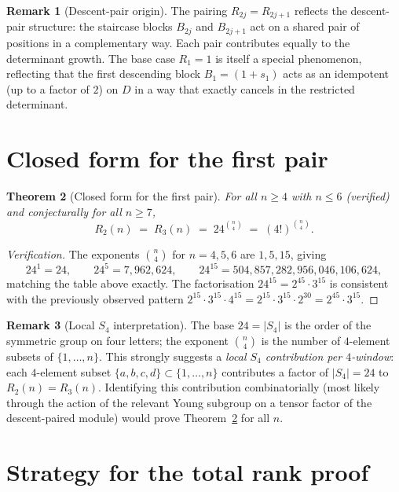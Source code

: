 \documentclass[11pt]{article}
\newtheorem{theorem}{Theorem}
\theoremstyle{definition}
\newtheorem{remark}[theorem]{Remark}
\begin{document}
\begin{remark}[Descent-pair origin]
The pairing $R_{2j} = R_{2j+1}$ reflects the descent-pair structure: the staircase blocks $B_{2j}$ and $B_{2j+1}$ act on a shared pair of positions in a complementary way. Each pair contributes equally to the determinant growth. The base case $R_1 = 1$ is itself a special phenomenon, reflecting that the first descending block $B_1 = (1+s_1)$ acts as an idempotent (up to a factor of $2$) on $D$ in a way that exactly cancels in the restricted determinant.
\end{remark}

\section{Closed form for the first pair}

\begin{theorem}[Closed form for the first pair]
\label{thm:firstpair}
For all $n \ge 4$ with $n \le 6$ (verified) and conjecturally for all $n \ge 7$,
\[
R_2(n) \;=\; R_3(n) \;=\; 24^{\binom{n}{4}} \;=\; (4!)^{\binom{n}{4}}.
\]
\end{theorem}

\begin{proof}[Verification]
The exponents $\binom{n}{4}$ for $n = 4, 5, 6$ are $1, 5, 15$, giving
\[
24^1 = 24, \qquad 24^5 = 7{,}962{,}624, \qquad 24^{15} = 504{,}857{,}282{,}956{,}046{,}106{,}624,
\]
matching the table above exactly. The factorisation $24^{15} = 2^{45} \cdot 3^{15}$ is consistent with the previously observed pattern $2^{15} \cdot 3^{15} \cdot 4^{15} = 2^{15}\cdot 3^{15} \cdot 2^{30} = 2^{45} \cdot 3^{15}$.
\end{proof}

\begin{remark}[Local $S_4$ interpretation]
The base $24 = |S_4|$ is the order of the symmetric group on four letters; the exponent $\binom{n}{4}$ is the number of $4$-element subsets of $\{1,\dots,n\}$. This strongly suggests a \emph{local $S_4$ contribution per $4$-window}: each $4$-element subset $\{a,b,c,d\} \subset \{1,\dots,n\}$ contributes a factor of $|S_4| = 24$ to $R_2(n) = R_3(n)$. Identifying this contribution combinatorially (most likely through the action of the relevant Young subgroup on a tensor factor of the descent-paired module) would prove Theorem~\ref{thm:firstpair} for all $n$.
\end{remark}

\section{Strategy for the total rank proof}
\end{document}
